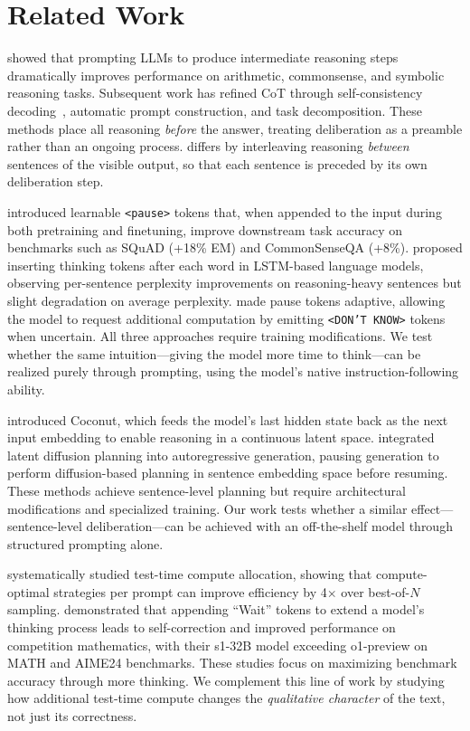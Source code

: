 \section{Related Work}
\label{sec:related_work}

\citet{wei2022chain} showed that prompting LLMs to produce intermediate reasoning steps dramatically improves performance on arithmetic, commonsense, and symbolic reasoning tasks.
Subsequent work has refined CoT through self-consistency decoding~\citep{wang2023selfconsistency}, automatic prompt construction, and task decomposition.
These methods place all reasoning \emph{before} the answer, treating deliberation as a preamble rather than an ongoing process.
\iscotshort differs by interleaving reasoning \emph{between} sentences of the visible output, so that each sentence is preceded by its own deliberation step.

\citet{goyal2024think} introduced learnable \texttt{<pause>} tokens that, when appended to the input during both pretraining and finetuning, improve downstream task accuracy on benchmarks such as SQuAD (+18\% EM) and CommonSenseQA (+8\%).
\citet{herel2024thinking} proposed inserting thinking tokens after each word in LSTM-based language models, observing per-sentence perplexity improvements on reasoning-heavy sentences but slight degradation on average perplexity.
\citet{galashov2025catch} made pause tokens adaptive, allowing the model to request additional computation by emitting \texttt{<DON'T KNOW>} tokens when uncertain.
All three approaches require training modifications.
We test whether the same intuition---giving the model more time to think---can be realized purely through prompting, using the model's native instruction-following ability.

\citet{hao2024coconut} introduced Coconut, which feeds the model's last hidden state back as the next input embedding to enable reasoning in a continuous latent space.
\citet{lovelace2025star} integrated latent diffusion planning into autoregressive generation, pausing generation to perform diffusion-based planning in sentence embedding space before resuming.
These methods achieve sentence-level planning but require architectural modifications and specialized training.
Our work tests whether a similar effect---sentence-level deliberation---can be achieved with an off-the-shelf model through structured prompting alone.

\citet{snell2024scaling} systematically studied test-time compute allocation, showing that compute-optimal strategies per prompt can improve efficiency by 4$\times$ over best-of-$N$ sampling.
\citet{muennighoff2025s1} demonstrated that appending ``Wait'' tokens to extend a model's thinking process leads to self-correction and improved performance on competition mathematics, with their s1-32B model exceeding o1-preview on MATH and AIME24 benchmarks.
These studies focus on maximizing benchmark accuracy through more thinking.
We complement this line of work by studying how additional test-time compute changes the \emph{qualitative character} of the text, not just its correctness.

